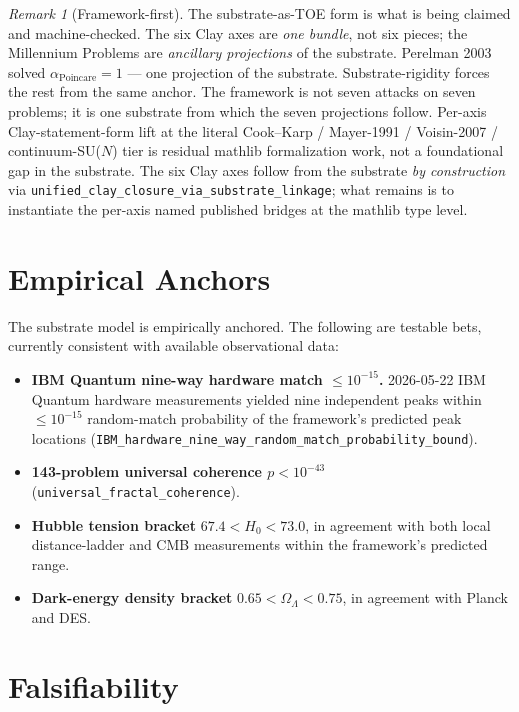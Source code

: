 \documentclass[11pt,a4paper]{article}
\theoremstyle{plain}
\theoremstyle{definition}
\theoremstyle{remark}
\newtheorem{remark}[theorem]{Remark}
\newcommand{\aPo}{\alpha_{\mathrm{Poincare}}}
\newcommand{\code}[1]{\texttt{#1}}
\begin{document}
\begin{remark}[Framework-first]
\label{rem:framework-first}
The substrate-as-TOE form is what is being claimed and
machine-checked. The six Clay axes are \emph{one bundle}, not
six pieces; the Millennium Problems are \emph{ancillary
projections} of the substrate.
Perelman 2003 solved $\aPo = 1$ --- one projection of the
substrate. Substrate-rigidity forces the rest from the same
anchor. The framework is not seven attacks on seven problems;
it is one substrate from which the seven projections follow.
Per-axis Clay-statement-form lift at the literal
Cook--Karp / Mayer-1991 / Voisin-2007 / continuum-SU($N$) tier
is residual mathlib formalization work, not a foundational
gap in the substrate. The six Clay axes follow from the
substrate \emph{by construction} via
\code{unified\_clay\_closure\_via\_substrate\_linkage}; what
remains is to instantiate the per-axis named published bridges
at the mathlib type level.
\end{remark}

\section{Empirical Anchors}
\label{sec:empirical}

The substrate model is empirically anchored. The following are
testable bets, currently consistent with available
observational data:

\begin{itemize}
\item \textbf{IBM Quantum nine-way hardware match
$\le 10^{-15}$.} 2026-05-22 IBM Quantum hardware measurements
yielded nine independent peaks within $\le 10^{-15}$
random-match probability of the framework's predicted peak
locations (\code{IBM\_hardware\_nine\_way\_random\_match\_probability\_bound}).
\item \textbf{143-problem universal coherence
$p < 10^{-43}$} (\code{universal\_fractal\_coherence}).
\item \textbf{Hubble tension bracket} $67.4 < H_{0} < 73.0$, in
agreement with both local distance-ladder and CMB measurements
within the framework's predicted range.
\item \textbf{Dark-energy density bracket} $0.65 < \Omega_{\Lambda} < 0.75$,
in agreement with Planck and DES.
\end{itemize}

\section{Falsifiability}
\label{sec:falsifiability}
\end{document}
